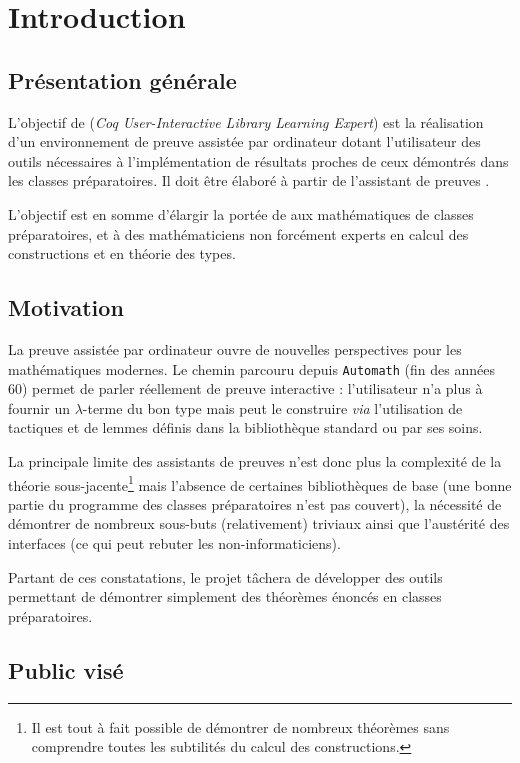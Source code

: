 \section{Introduction}

\subsection{Présentation générale}

L'objectif de \coquille{} (\emph{Coq User-Interactive Library Learning Expert}) est la réalisation d'un environnement de preuve assistée par ordinateur dotant l'utilisateur des outils nécessaires à l'implémentation de résultats proches de ceux démontrés dans les classes préparatoires. Il doit être élaboré à partir de l'assistant de preuves \coq{}.

L'objectif est en somme d'élargir la portée de \coq{} aux mathématiques de classes préparatoires, et à des mathématiciens non forcément experts en calcul des constructions et en théorie des types.

\subsection{Motivation}

La preuve assistée par ordinateur ouvre de nouvelles perspectives pour les mathématiques modernes. Le chemin parcouru depuis \texttt{Automath}\cite{automath} (fin des années 60) permet de parler réellement de preuve interactive : l'utilisateur n'a plus à fournir un $\lambda$-terme du bon type mais peut le construire \emph{via} l'utilisation de tactiques et de lemmes définis dans la bibliothèque standard ou par ses soins.

La principale limite des assistants de preuves n'est donc plus la complexité de la théorie sous-jacente\footnote{Il est tout à fait possible de démontrer de nombreux théorèmes sans comprendre toutes les subtilités du calcul des constructions.} mais l'absence de certaines bibliothèques de base (une bonne partie du programme des classes préparatoires n'est pas couvert), la nécessité de démontrer de nombreux sous-buts (relativement) triviaux ainsi que l'austérité des interfaces (ce qui peut rebuter les non-informaticiens).

Partant de ces constatations, le projet \coquille{} tâchera de développer des outils permettant de démontrer simplement des théorèmes énoncés en classes préparatoires.

\subsection{Public visé}

